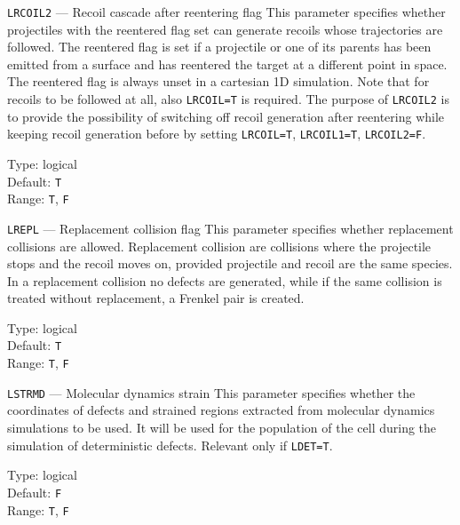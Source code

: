 \begin{keydescription}{\texttt{LRCOIL2} --- Recoil cascade after reentering
flag}
%
  This parameter specifies whether projectiles with the reentered flag set can
  generate recoils whose trajectories are followed. The reentered flag is
  set if a projectile or one of its parents has been emitted from a surface
  and has reentered the target at a different point in space. The reentered flag
  is always unset in a cartesian 1D simulation. Note that for recoils to be
  followed at all, also \texttt{LRCOIL=T} is required. The purpose of
  \texttt{LRCOIL2} is to provide the possibility of switching off recoil
  generation after reentering while keeping recoil generation before by
  setting \texttt{LRCOIL=T}, \texttt{LRCOIL1=T}, \texttt{LRCOIL2=F}.
  \begin{keytab}
    Type:    \> logical \\
    Default: \> \texttt{T} \\
    Range:   \> \texttt{T}, \texttt{F}
  \end{keytab}
\end{keydescription}

\begin{keydescription}{\texttt{LREPL} --- Replacement collision flag}
%
  This parameter specifies whether replacement collisions are allowed.
  Replacement collision are collisions where the projectile stops and the 
  recoil moves on, provided projectile and recoil are the same species. In
  a replacement collision no defects are generated, while if the same collision
  is treated without replacement, a Frenkel pair is created.
  \begin{keytab}
    Type:    \> logical \\
    Default: \> \texttt{T} \\
    Range:   \> \texttt{T}, \texttt{F}
  \end{keytab}
\end{keydescription}

\ifprivate
\begin{keydescription}{\texttt{LSTRMD} --- Molecular dynamics strain}
%
  This parameter specifies whether the coordinates of defects and strained
  regions extracted from molecular dynamics simulations to be used.  It will
  be used for the population of the cell during the simulation of deterministic
  defects. Relevant only if \texttt{LDET=T}.

  \begin{keytab} 
    Type: \> logical \\ 
    Default: \> \texttt{F} \\ 
    Range: \>  \texttt{T}, \texttt{F}
  \end{keytab}
\end{keydescription}
\fi

